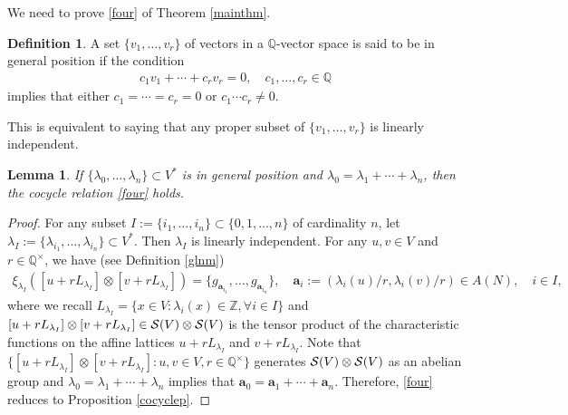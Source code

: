 \documentclass[12pt,amstex,amssymb]{article}
\theoremstyle{plain}
\newtheorem{lemma}[theorem]{Lemma}
\theoremstyle{definition}
\newtheorem{definition}[theorem]{Definition}
\def\cS{{\cal S}}
\def\Z{{\mathbb Z}}
\def\Q{{\mathbb Q}}
\def\l{\lambda}
\newcommand{\be}{\begin{eqnarray*}}
\newcommand{\ee}{\end{eqnarray*}}
\newcommand{\bea}{\begin{eqnarray}}
\newcommand{\eea}{\end{eqnarray}}
\newcommand{\ba}{\mathbf{a}}
\begin{document}
{We need to prove \eqref{four} of Theorem \ref{mainthm}. 
\begin{definition}
A set $\{v_1, \ldots, v_r\}$ of vectors in a $\Q$-vector space is said to be in general position if
the condition  
\be
c_1 v_1 + \cdots +c_r v_r = 0, \quad c_1, \ldots, c_r \in \Q
\ee
implies that either $c_1=\cdots =c_r =0$ or $c_1 \cdots c_r \neq 0$.
\end{definition}
This is equivalent to saying that any proper subset of $\{v_1, \ldots, v_r\}$ is linearly independent.
\begin{lemma}\label{flem}
If $\{\l_0, \ldots, \l_n\} \subset V^*$ is in general position and $\l_0=\l_1 +\cdots + \l_n$, then the cocycle relation \eqref{four} holds.
\end{lemma}
\begin{proof}
For any subset $I:=\{i_1, \ldots, i_n\}\subset \{0, 1, \ldots, n\}$ of cardinality $n$, let $\l_I:=\{\l_{i_1}, \ldots, \l_{i_n}\} \subset V^*$.
Then $\l_I$ is linearly independent.
For any $u, v \in V$ and $r \in \Q^\times$, we have (see Definition \ref{glnm})
\bea \label{computation}
\xi_{\l_I} \left([u+rL_{\l_I}] \otimes [v+rL_{\l_I}]\right)
=\{g_{\ba_{i_1}}, \ldots, g_{\ba_{i_n}} \}, \quad
\ba_{i}:=(\l_{i}(u)/r,\l_{i}(v)/r) \in A(N), \quad i \in I,
\eea
where we recall $L_{\l_I}=\{ x \in V : \l_{i}(x) \in \Z, \forall i \in I\}$ and $[u+r L_{\l_I}] \otimes [v+r L_{\l_I}] \in \cS(V)\otimes \cS(V)$ is the tensor product of the characteristic functions on the affine lattices $u+r L_{\l_I}$ and $v+r L_{\l_I}$.
Note that $\{ [u+rL_{\l_I}] \otimes [v+rL_{\l_I}] : u, v\in V, r \in \Q^\times\}$ generates $\cS(V)\otimes \cS(V)$ as an abelian group and $\l_0=\l_1 +\cdots + \l_n$ implies that $\ba_0=\ba_1+ \cdots + \ba_n$. Therefore, \eqref{four} reduces to Proposition \ref{cocyclep}.
\end{proof}


}
\end{document}
